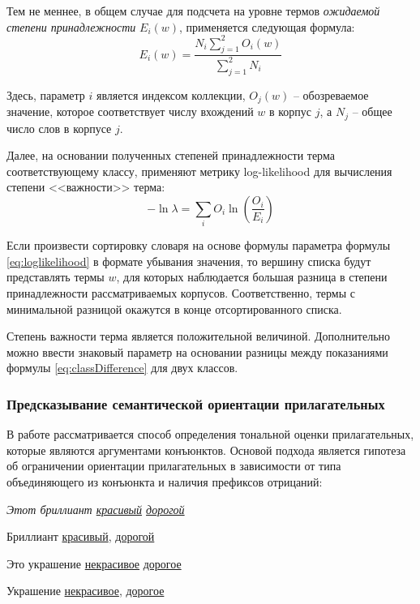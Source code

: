         Тем не меннее, в общем случае для подсчета на уровне термов {\it ожидаемой
        степени принадлежности} $E_i(w)$, применяется следующая формула:
        \begin{equation}
            \label{eq:classDifference}
            E_i(w) = \dfrac{N_i\sum\limits_{j=1}^{2}O_i(w)}{\sum\limits_{j=1}^{2}N_i}
        \end{equation}

        Здесь, параметр $i$ является индексом коллекции, $O_j(w)$ -- обозреваемое
        значение, которое соответствует числу вхождений $w$ в корпус $j$, а $N_j$
        -- общее число слов в корпусе $j$.

        Далее, на основании полученных степеней принадлежности терма соответствующему
        классу, применяют метрику log-likelihood для вычисления степени <<важности>>
        терма:
        \begin{equation}
            \label{eq:loglikelihood}
            - \ln \lambda = \sum\limits_i O_i \ln \left( \dfrac{O_i}{E_i} \right)
        \end{equation}

        Если произвести сортировку словаря на основе формулы параметра формулы
        \ref{eq:loglikelihood} в формате убывания значения, то вершину списка
        будут представлять термы $w$, для которых наблюдается большая разница в
        степени принадлежности рассматриваемых корпусов. Соответственно, термы
        с минимальной разницой окажутся в конце отсортированного списка.

        Степень важности терма является положительной величиной. Дополнительно можно
        ввести знаковый параметр на основании разницы между показаниями формулы
        \ref{eq:classDifference} для двух классов.

        \subsubsection{Предсказывание семантической ориентации прилагательных}
        \label{sec:adjectivesPrediction}
        В работе \cite{lexiconAdjectives} рассматривается способ определения
        тональной оценки прилагательных, которые являются аргументами конъюнктов.
        Основой подхода является гипотеза об ограничении ориентации прилагательных
        в зависимости от типа объединяющего из конъюнкта и наличия префиксов отрицаний:
        \begin{center}
            \it
            Этот бриллиант \underline{красивый} {} \underline{дорогой}

            Бриллиант \underline{красивый}, {} \underline{дорогой}

            Это украшение \underline{некрасивое} {} \underline{дорогое}

            Украшение \underline{некрасивое}, {} \underline{дорогое}
        \end{center}

